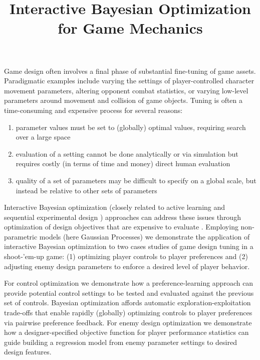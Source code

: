 \documentclass[letterpaper]{article}
\begin{document}
%
\title{Interactive Bayesian Optimization for Game Mechanics}
\author{
}



\maketitle
\begin{abstract}
\begin{quote}
\end{quote}
\end{abstract}

\noindent Game design often involves a final phase of substantial fine-tuning of game assets. Paradigmatic examples include varying the settings of player-controlled character movement parameters, altering opponent combat statistics, or varying low-level parameters around movement and collision of game objects. Tuning is often a time-consuming and expensive process for several reasons:
\begin{enumerate}
\item parameter values must be set to (globally) optimal values, requiring search over a large space
\item evaluation of a setting cannot be done analytically or via simulation but requires costly (in terms of time and money) direct human evaluation
\item quality of a set of parameters may be difficult to specify on a global scale, but instead be relative to other sets of parameters
\end{enumerate}

Interactive Bayesian optimization (closely related to active learning \cite{settles2012:al-book} and sequential experimental design \cite{chaloner1995}) approaches can address these issues through optimization of design objectives that are expensive to evaluate \cite{brochu2010:thesis}. Employing non-parametric models (here Gaussian Processes) we demonstrate the application of interactive Bayesian optimization to two cases studies of game design tuning in a shoot-'em-up game: (1) optimizing player controls to player preferences and (2) adjusting enemy design parameters to enforce a desired level of player behavior.

For control optimization we demonstrate how a preference-learning approach can provide potential control settings to be tested and evaluated against the previous set of controls. Bayesian optimization affords automatic exploration-exploitation trade-offs that enable rapidly (globally) optimizing controls to player preferences via pairwise preference feedback. For enemy design optimization we demonstrate how a designer-specified objective function for player performance statistics can guide building a regression model from enemy parameter settings to desired design features.
\end{document}

